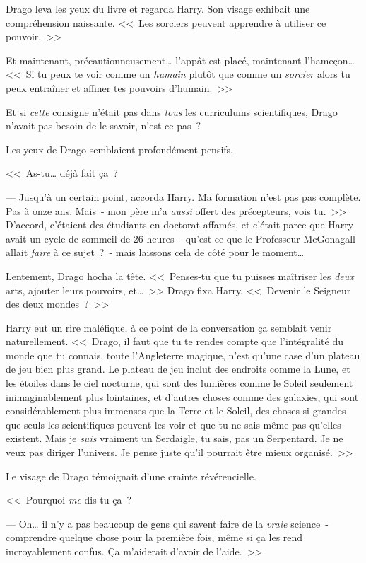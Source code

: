 Drago leva les yeux du livre et regarda Harry. Son visage exhibait une compréhension naissante. <<~Les sorciers peuvent apprendre à utiliser ce pouvoir.~>>

Et maintenant, précautionneusement… l'appât est placé, maintenant l'hameçon… <<~Si tu peux te voir comme un \emph{humain} plutôt que comme un \emph{sorcier} alors tu peux entraîner et affiner tes pouvoirs d'humain.~>>

Et si \emph{cette} consigne n'était pas dans \emph{tous} les curriculums scientifiques, Drago n'avait pas besoin de le savoir, n'est-ce pas~?

Les yeux de Drago semblaient profondément pensifs.

<<~As-tu… déjà fait ça~?

--- Jusqu'à un certain point, accorda Harry. Ma formation n'est pas pas complète. Pas à onze ans. Mais~- mon père m'a \emph{aussi} offert des précepteurs, vois tu.~>> D'accord, c'étaient des étudiants en doctorat affamés, et c'était parce que Harry avait un cycle de sommeil de 26 heures~- qu'est ce que le Professeur McGonagall allait \emph{faire} à ce sujet~?~- mais laissons cela de côté pour le moment…

Lentement, Drago hocha la tête. <<~Penses-tu que tu puisses maîtriser les \emph{deux} arts, ajouter leurs pouvoirs, et…~>> Drago fixa Harry. <<~Devenir le Seigneur des deux mondes~?~>>

Harry eut un rire maléfique, à ce point de la conversation ça semblait venir naturellement. <<~Drago, il faut que tu te rendes compte que l'intégralité du monde que tu connais, toute l'Angleterre magique, n'est qu'une case d'un plateau de jeu bien plus grand. Le plateau de jeu inclut des endroits comme la Lune, et les étoiles dans le ciel nocturne, qui sont des lumières comme le Soleil seulement inimaginablement plus lointaines, et d'autres choses comme des galaxies, qui sont considérablement plus immenses que la Terre et le Soleil, des choses si grandes que seuls les scientifiques peuvent les voir et que tu ne sais même pas qu'elles existent. Mais je \emph{suis} vraiment un Serdaigle, tu sais, pas un Serpentard. Je ne veux pas diriger l'univers. Je pense juste qu'il pourrait être mieux organisé.~>>

Le visage de Drago témoignait d'une crainte révérencielle.

<<~Pourquoi \emph{me} dis tu ça~?

--- Oh… il n'y a pas beaucoup de gens qui savent faire de la \emph{vraie} science~- comprendre quelque chose pour la première fois, même si ça les rend incroyablement confus. Ça m'aiderait d'avoir de l'aide.~>>

